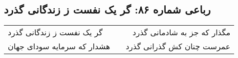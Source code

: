 \begin{center}
\section*{رباعی شماره ۸۶: گر یک نفست ز زندگانی گذرد}
\label{sec:sh086}
\begin{longtable}{l p{0.5cm} r}
گر یک نفست ز زندگانی گذرد
&&
مگذار که جز به شادمانی گذرد
\\
هشدار که سرمایه سودای جهان
&&
عمرست چنان کش گذرانی گذرد
\\
\end{longtable}
\end{center}

